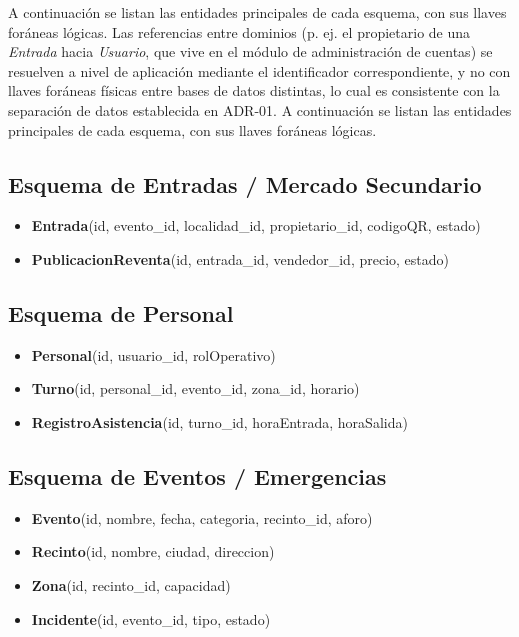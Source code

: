 A continuación se listan las entidades principales de cada esquema, con sus llaves foráneas lógicas. Las referencias entre dominios (p. ej. el propietario de una
\textit{Entrada} hacia \textit{Usuario}, que vive en el módulo de administración de cuentas) se
resuelven a nivel de aplicación mediante el identificador correspondiente, y no con llaves foráneas
físicas entre bases de datos distintas, lo cual es consistente con la separación de datos
establecida en ADR-01. A continuación se listan las entidades principales de cada esquema, con sus
llaves foráneas lógicas.

\subsection*{Esquema de Entradas / Mercado Secundario}
\begin{itemize}
\item \textbf{Entrada}(id, evento\_id, localidad\_id, propietario\_id, codigoQR, estado)
\item \textbf{PublicacionReventa}(id, entrada\_id, vendedor\_id, precio, estado)
\end{itemize}

\subsection*{Esquema de Personal}
\begin{itemize}
\item \textbf{Personal}(id, usuario\_id, rolOperativo)
\item \textbf{Turno}(id, personal\_id, evento\_id, zona\_id, horario)
\item \textbf{RegistroAsistencia}(id, turno\_id, horaEntrada, horaSalida)
\end{itemize}

\subsection*{Esquema de Eventos / Emergencias}
\begin{itemize}
\item \textbf{Evento}(id, nombre, fecha, categoria, recinto\_id, aforo)
\item \textbf{Recinto}(id, nombre, ciudad, direccion)
\item \textbf{Zona}(id, recinto\_id, capacidad)
\item \textbf{Incidente}(id, evento\_id, tipo, estado)
\end{itemize}

